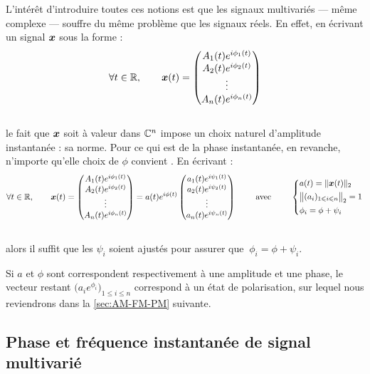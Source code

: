 L'intérêt d'introduire toutes ces notions est que les signaux multivariés --- même complexe --- souffre du même problème que les signaux réels. 
En effet, en écrivant un signal $\boldsymbol{x}$ sous la forme :
\[\forall t\in\mathbb{R},\qquad 
\boldsymbol{x}(t) = \begin{pmatrix} A_1(t)e^{i\phi_1(t)} \\ A_2(t)e^{i\phi_2(t)} \\ \vdots \\ A_n(t)e^{i\phi_n(t)}
\end{pmatrix}\]
\\
le fait que $\boldsymbol{x}$ soit à valeur dans $\mathbb{C}^n$ impose un choix naturel d'amplitude instantanée : sa norme. Pour ce qui est de la phase instantanée, en revanche, n'importe qu'elle choix de $\phi$ convient \apriori. En écrivant :
\[\forall t\in\mathbb{R},\qquad 
\boldsymbol{x}(t) = \begin{pmatrix} A_1(t)e^{i\phi_1(t)} \\ A_2(t)e^{i\phi_2(t)} \\ \vdots \\ A_n(t)e^{i\phi_n(t)} \end{pmatrix}
= a(t)e^{i\phi(t)}\begin{pmatrix} a_1(t)e^{i\psi_1(t)} \\ a_2(t)e^{i\psi_2(t)} \\ \vdots \\ a_n(t)e^{i\psi_n(t)} \end{pmatrix}
\qquad\text{ avec }\qquad 
\left\{ \begin{aligned}
	& a(t) = \| \boldsymbol{x}(t) \|_2 \\
	& \big\|(a_i)_{1\leqslant i\leqslant n}\big\|_2 = 1 \\
	& \phi_i = \phi + \psi_i \end{aligned}\right.\]
\\
alors il suffit que les $\psi_i$ soient ajustés pour assurer que $\ \phi_i = \phi + \psi_i$.
\\
\begin{remarque}
	Si $a$ et $\phi$ sont correspondent respectivement à une amplitude et une phase, le vecteur restant $\big( a_ie^{\phi_i} \big)_{1\leq i\leq n}$ correspond à un état de polarisation, sur lequel nous reviendrons dans la \cref{sec:AM-FM-PM} suivante.
\end{remarque}
\skipl




\subsection{Phase et fréquence instantanée de signal multivarié }\label{subsec:intro_phased}

